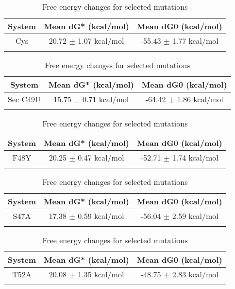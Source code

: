 \documentclass{article}
\begin{document}
\begin{table}[ht]
    \centering
    \begin{tabular}{|c|c|c|}
    \hline
    System & Mean dG* (kcal/mol) & Mean dG0 (kcal/mol) \\
    \hline
        Cys & 20.72 $\pm$ 1.07 kcal/mol & -55.43 $\pm$ 1.77 kcal/mol \\ \\
    \hline
    \end{tabular}
    \caption{Free energy changes for selected mutations}
\end{table}
\begin{table}[ht]
    \centering
    \begin{tabular}{|c|c|c|}
    \hline
    System & Mean dG* (kcal/mol) & Mean dG0 (kcal/mol) \\
    \hline
        Sec C49U & 15.75 $\pm$ 0.71 kcal/mol & -64.42 $\pm$ 1.86 kcal/mol \\ \\
    \hline
    \end{tabular}
    \caption{Free energy changes for selected mutations}
\end{table}
\begin{table}[ht]
    \centering
    \begin{tabular}{|c|c|c|}
    \hline
    System & Mean dG* (kcal/mol) & Mean dG0 (kcal/mol) \\
    \hline
        F48Y & 20.25 $\pm$ 0.47 kcal/mol & -52.71 $\pm$ 1.74 kcal/mol \\ \\
    \hline
    \end{tabular}
    \caption{Free energy changes for selected mutations}
\end{table}
\begin{table}[ht]
    \centering
    \begin{tabular}{|c|c|c|}
    \hline
    System & Mean dG* (kcal/mol) & Mean dG0 (kcal/mol) \\
    \hline
        S47A & 17.38 $\pm$ 0.59 kcal/mol & -56.04 $\pm$ 2.59 kcal/mol \\ \\
    \hline
    \end{tabular}
    \caption{Free energy changes for selected mutations}
\end{table}
\begin{table}[ht]
    \centering
    \begin{tabular}{|c|c|c|}
    \hline
    System & Mean dG* (kcal/mol) & Mean dG0 (kcal/mol) \\
    \hline
        T52A & 20.08 $\pm$ 1.35 kcal/mol & -48.75 $\pm$ 2.83 kcal/mol \\ \\
    \hline
    \end{tabular}
    \caption{Free energy changes for selected mutations}
\end{table}
\end{document}
